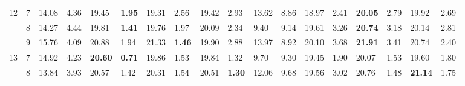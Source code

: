\documentclass[conference]{IEEEtran}
\begin{document}
\begin{table}[]
\begin{tabular}{|cl|ll|ll|ll|ll|ll|ll|ll|ll|}
		\multicolumn{1}{|c|}{\multirow{3}{*}{12}} & 7          & \multicolumn{1}{l|}{14.08}         & 4.36          & \multicolumn{1}{l|}{19.45}          & \textbf{1.95} & \multicolumn{1}{l|}{19.31}          & 2.56          & \multicolumn{1}{l|}{19.42}          & 2.93          & \multicolumn{1}{l|}{13.62}                & 8.86  & \multicolumn{1}{l|}{18.97} & 2.41 & \multicolumn{1}{l|}{\textbf{20.05}} & 2.79          & \multicolumn{1}{l|}{19.92}          & 2.69          \\ \cline{2-18} 
		\multicolumn{1}{|c|}{}                    & 8          & \multicolumn{1}{l|}{14.27}         & 4.44          & \multicolumn{1}{l|}{19.81}          & \textbf{1.41} & \multicolumn{1}{l|}{19.76}          & 1.97          & \multicolumn{1}{l|}{20.09}          & 2.34          & \multicolumn{1}{l|}{9.40}                 & 9.14  & \multicolumn{1}{l|}{19.61} & 3.26 & \multicolumn{1}{l|}{\textbf{20.74}} & 3.18          & \multicolumn{1}{l|}{20.14}          & 2.81          \\ \cline{2-18} 
		\multicolumn{1}{|c|}{}                    & 9          & \multicolumn{1}{l|}{15.76}         & 4.09          & \multicolumn{1}{l|}{20.88}          & 1.94          & \multicolumn{1}{l|}{21.33}          & \textbf{1.46} & \multicolumn{1}{l|}{19.90}          & 2.88          & \multicolumn{1}{l|}{13.97}                & 8.92  & \multicolumn{1}{l|}{20.10} & 3.68 & \multicolumn{1}{l|}{\textbf{21.91}} & 3.41          & \multicolumn{1}{l|}{20.74}          & 2.40          \\ \hline
		\multicolumn{1}{|c|}{\multirow{3}{*}{13}} & 7          & \multicolumn{1}{l|}{14.92}         & 4.23          & \multicolumn{1}{l|}{\textbf{20.60}} & \textbf{0.71} & \multicolumn{1}{l|}{19.86}          & 1.53          & \multicolumn{1}{l|}{19.84}          & 1.32          & \multicolumn{1}{l|}{9.70}                 & 9.30  & \multicolumn{1}{l|}{19.45} & 1.90 & \multicolumn{1}{l|}{20.07}          & 1.53          & \multicolumn{1}{l|}{19.60}          & 1.80          \\ \cline{2-18} 
		\multicolumn{1}{|c|}{}                    & 8          & \multicolumn{1}{l|}{13.84}         & 3.93          & \multicolumn{1}{l|}{20.57}          & 1.42          & \multicolumn{1}{l|}{20.31}          & 1.54          & \multicolumn{1}{l|}{20.51}          & \textbf{1.30} & \multicolumn{1}{l|}{12.06}                & 9.68  & \multicolumn{1}{l|}{19.56} & 3.02 & \multicolumn{1}{l|}{20.76}          & 1.48          & \multicolumn{1}{l|}{\textbf{21.14}} & 1.75          \\ \cline{2-18} 

\end{tabular}
\end{table}
\end{document}
